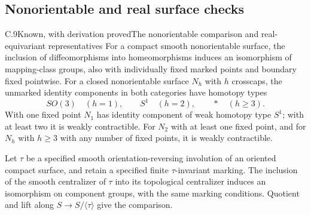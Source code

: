 \subsection{Nonorientable and real surface checks}

\begin{result}{C.9}{Known, with derivation proved}{The nonorientable comparison and real-equivariant representatives}
For a compact smooth nonorientable surface, the inclusion of
diffeomorphisms into homeomorphisms induces an isomorphism of
mapping-class groups, also with individually fixed marked points
and boundary fixed pointwise. For a closed nonorientable surface
$N_h$ with $h$ crosscaps, the unmarked identity components in both
categories have homotopy types
\[
 SO(3)\quad(h=1),\qquad S^1\quad(h=2),\qquad *\quad(h\geq3).
\]
With one fixed point $N_1$ has identity component of weak homotopy
type $S^1$; with at least two it is weakly contractible.
For $N_2$ with at least one fixed point, and for $N_h$ with
$h\geq3$ with any number of fixed points, it is weakly contractible.

Let $\tau$ be a specified smooth orientation-reversing involution
of an oriented compact surface, and retain a specified finite
$\tau$-invariant marking. The inclusion of the smooth centralizer
of $\tau$ into its topological centralizer induces an isomorphism
on component groups, with the same marking conditions. Quotient
and lift along $S\to S/\langle\tau\rangle$ give the comparison.
\end{result}
